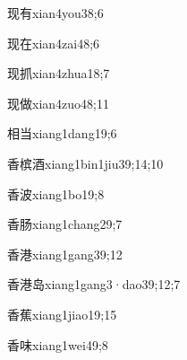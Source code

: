 \begin{verbete}{现有}{xian4you3}{8;6}
\end{verbete}

\begin{verbete}{现在}{xian4zai4}{8;6}
\end{verbete}

\begin{verbete}{现抓}{xian4zhua1}{8;7}
\end{verbete}

\begin{verbete}{现做}{xian4zuo4}{8;11}
\end{verbete}

\begin{verbete}{相当}{xiang1dang1}{9;6}
\end{verbete}

\begin{verbete}{香槟酒}{xiang1bin1jiu3}{9;14;10}
\end{verbete}

\begin{verbete}{香波}{xiang1bo1}{9;8}
\end{verbete}

\begin{verbete}{香肠}{xiang1chang2}{9;7}
\end{verbete}

\begin{verbete}{香港}{xiang1gang3}{9;12}
\end{verbete}

\begin{verbete}{香港岛}{xiang1gang3·dao3}{9;12;7}
\end{verbete}

\begin{verbete}{香蕉}{xiang1jiao1}{9;15}
\end{verbete}

\begin{verbete}{香味}{xiang1wei4}{9;8}
\end{verbete}

